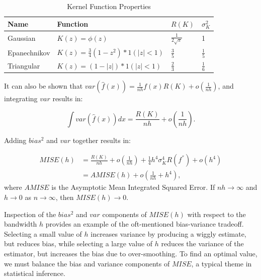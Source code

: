 \documentclass[]{article}
\begin{document}
\begin{table}[ht]
\caption{Kernel Function Properties} %
\centering %
\begin{tabular}{l l l l} %
\hline\hline %
Name & Function & $R(K)$ & $\sigma_K^2$ \\ [0.5ex] %
\hline %
Gaussian & $ K(z) = \phi(z)$ & $\frac{1}{2\sqrt{\pi}}$ & 1 \\ [1.5ex] %
Epanechnikov & $K(z) = \frac{3}{4}  (1 - z^2)*1(|z| <1)$ & $\frac{3}{5}$ & $\frac{1}{5}$ \\ [1.5ex]
Triangular & $K(z)= (1 - |z|) * 1(|z| < 1)$ & $\frac{2}{3}$ & $\frac{1}{6}$ \\ [1ex] %
\hline %
\end{tabular}
\label{table:kernprop} %
\end{table}

It can also be shown that
\(var\left(\hat{f}(x)\right) = \frac{1}{nh}f(x)R(K) + o(\frac{1}{nh})\),
and integrating \(var\) results in:

\[\int var\left(\hat{f}(x)\right)dx = \frac{R(K)}{nh} + o(\frac{1}{nh}).\]

Adding \(bias^2\) and \(var\) together results in:

\[
\begin{aligned}
MISE(h) &= \frac{R(K)}{nh} + o\left(\frac{1}{nh}\right) + \frac{1}{4}h^4 \sigma_K^4R(f^{''}) + o\left(h^4\right) \\
&= AMISE(h) + o\left(\frac{1}{nh} + h^4\right),
\end{aligned}
\] where \(AMISE\) is the Asymptotic Mean Integrated Squared Error. If
\(nh \rightarrow \infty\) and \(h \rightarrow 0\) as
\(n \rightarrow \infty\), then \(MISE(h) \rightarrow 0\).

Inspection of the \(bias^2\) and \(var\) components of \(MISE(h)\) with
respect to the bandwidth \(h\) provides an example of the oft-mentioned
bias-variance tradeoff. Selecting a small value of \(h\) increases
variance by producing a wiggly estimate, but reduces bias, while
selecting a large value of \(h\) reduces the variance of the estimator,
but increases the bias due to over-smoothing. To find an optimal value,
we must balance the bias and variance components of \(MISE\), a typical
theme in statistical inference.
\end{document}
